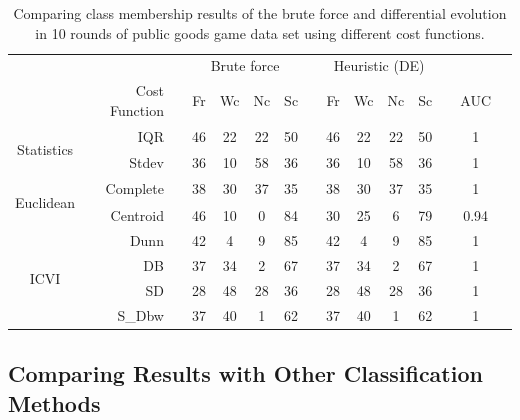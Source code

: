 \begin{table}[!h]
    \small
    \centering
    \caption{Comparing class membership results of the brute force and differential evolution in 10 rounds of public goods game data set using different cost functions.}
    \label{tab:ClassMembership_BF_VS_DE}
    \begin{tabular}{@{}crccccccccccccc@{}}
        \toprule
        &&& \multicolumn{4}{c}{Brute force} && \multicolumn{4}{c}{Heuristic (DE)}&&& \\
        &Cost Function &   & Fr  & Wc & Nc & Sc && Fr  & Wc & Nc & Sc && AUC & \\
        \midrule
        \multirow{2}{*}{\begin{turn}{90}{\scriptsize Statistics}\end{turn}}
        & IQR           && 46 & 22 & 22 & 50 && 46 & 22 & 22 & 50 && 1 & \\
        & Stdev         && 36 & 10 & 58 & 36 && 36 & 10 & 58 & 36 && 1 &  \\
        
        \midrule
        \multirow{2}{*}{\begin{turn}{90}{\scriptsize Euclidean}\end{turn}}
        & Complete      && 38  & 30 & 37 & 35 && 38  & 30 & 37 & 35 && 1 & \\
        & Centroid      && 46  & 10 & 0  & 84 && 30  & 25 & 6  & 79 && 0.94 & \\
        
        \midrule
        \multirow{4}{*}{\begin{turn}{90}{\scriptsize ICVI }\end{turn}}
        & Dunn          && 42 & 4  & 9  & 85 && 42 & 4  & 9  & 85 && 1 & \\
        & DB            && 37 & 34 & 2  & 67 && 37 & 34 & 2  & 67 && 1 & \\
        & SD            && 28 & 48 & 28 & 36 && 28 & 48 & 28 & 36 && 1 & \\
        & S\_Dbw        && 37 & 40 & 1  & 62 && 37 & 40 & 1  & 62 && 1 & \\
        \bottomrule
    \end{tabular}
\end{table}

\subsection{Comparing Results with Other Classification Methods}

